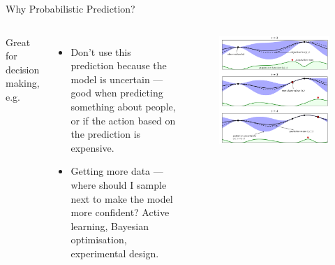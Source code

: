 \documentclass[lualatex, aspectratio=169]{beamer}
\begin{document}
\begin{frame}{Why Probabilistic Prediction?}

  \begin{columns}
    \column{0.5\pagewidth}
    Great for decision making, e.g.
    \begin{itemize}
      \item Don't use this prediction because the model is uncertain --- good when predicting something about people, or if the action based on the prediction is expensive.
      \item Getting more data --- where should I sample next to make the model more confident? Active learning, Bayesian optimisation, experimental design.
    \end{itemize}
    \column{0.4\pagewidth}
    \begin{figure}
      \includegraphics[width=0.4\pagewidth]{assets/bayesopt.png}
    \end{figure}
  \end{columns}

\end{frame}
\end{document}
